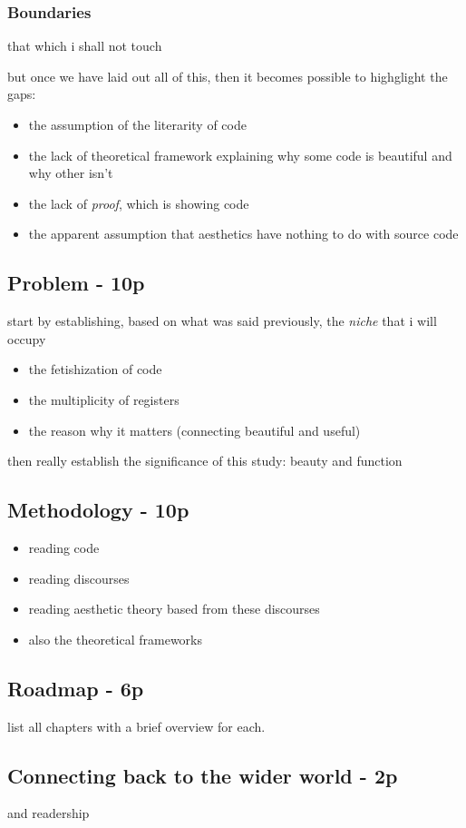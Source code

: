 \subsubsection{Boundaries}

that which i shall not touch

but once we have laid out all of this, then it becomes possible to highglight the gaps:
\begin{itemize}
    \item the assumption of the literarity of code
    \item the lack of theoretical framework explaining why some code is beautiful and why other isn't
    \item the lack of \emph{proof}, which is showing code
    \item the apparent assumption that aesthetics have nothing to do with source code
\end{itemize}

\subsection{Problem - 10p}

start by establishing, based on what was said previously, the \emph{niche} that i will occupy

\begin{itemize}
    \item the fetishization of code
    \item the multiplicity of registers
    \item the reason why it matters (connecting beautiful and useful)
\end{itemize}

then really establish the significance of this study: beauty and function

\subsection{Methodology - 10p}

\begin{itemize}
    \item reading code
    \item reading discourses
    \item reading aesthetic theory based from these discourses
    \item also the theoretical frameworks
\end{itemize}

\subsection{Roadmap - 6p}

list all chapters with a brief overview for each.

\subsection{Connecting back to the wider world - 2p}

and readership